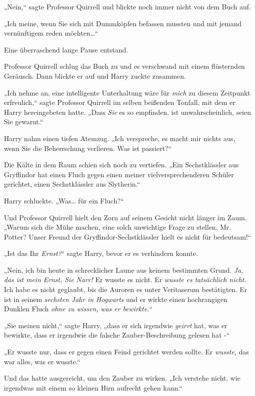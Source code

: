 {„Nein,“ sagte Professor Quirrell und blickte noch immer nicht von dem Buch auf.

„Ich meine, wenn Sie sich mit Dummköpfen befassen mussten und mit jemand vernünftigem reden möchten…“

Eine überraschend lange Pause entstand.

Professor Quirrell schlug das Buch zu und es verschwand mit einem flüsternden Geräusch. Dann blickte er auf und Harry zuckte zusammen.

„Ich nehme an, eine intelligente Unterhaltung wäre für \emph{mich} zu diesem Zeitpunkt erfreulich,“ sagte Professor Quirrell im selben beißenden Tonfall, mit dem er Harry hereingebeten hatte. „Dass \emph{Sie} es so empfinden, ist unwahrscheinlich, seien Sie gewarnt.“

Harry nahm einen tiefen Atemzug. „Ich verspreche, es macht mir nichts aus, wenn Sie die Beherrschung verlieren. Was ist passiert?“

Die Kälte in dem Raum schien sich noch zu vertiefen. „Ein Sechstklässler aus Gryffindor hat einen Fluch gegen einen meiner vielversprechenderen Schüler gerichtet, einen Sechstklässler aus Slytherin.“

Harry schluckte. „Was… für ein Fluch?“

Und Professor Quirrell hielt den Zorn auf seinem Gesicht nicht länger im Zaum. „Warum sich die Mühe machen, eine solch unwichtige Frage zu stellen, Mr. Potter? Unser Freund der Gryffindor-Sechstklässler hielt es nicht für bedeutsam!“

„Ist das Ihr \emph{Ernst?}“ sagte Harry, bevor er es verhindern konnte.

„Nein, ich bin heute in schrecklicher Laune aus keinem bestimmten Grund. \emph{Ja, das ist mein Ernst, Sie Narr!} Er wusste es nicht. Er \emph{wusste es tatsächlich nicht.} Ich habe es nicht geglaubt, bis die Auroren es unter Veritaserum bestätigten. Er ist in seinem \emph{sechsten Jahr in Hogwarts} und er wirkte einen hochrangigen Dunklen Fluch \emph{ohne zu wissen, was er bewirkte.}“

„Sie meinen nicht,“ sagte Harry, „dass er sich irgendwie \emph{geirrt} hat, was er bewirkte, dass er irgendwie die falsche Zauber-Beschreibung gelesen hat -“

„Er wusste nur, dass er gegen einen Feind gerichtet werden sollte. Er \emph{wusste,} das war alles, was er wusste.“

Und das hatte ausgereicht, um den Zauber zu wirken. „Ich verstehe nicht, wie irgendwas mit einem so kleinen Hirn aufrecht gehen kann.“

}
